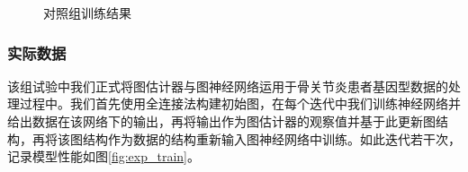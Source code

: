 \begin{figure}[ht]
\centering
{}
\caption{对照组训练结果}
\label{fig:baseline_train}
\end{figure}

\subsubsection{实际数据}

该组试验中我们正式将图估计器与图神经网络运用于骨关节炎患者基因型数据的处理过程中。我们首先使用全连接法构建初始图，在每个迭代中我们训练神经网络并给出数据在该网络下的输出，再将输出作为图估计器的观察值并基于此更新图结构，再将该图结构作为数据的结构重新输入图神经网络中训练。如此迭代若干次，记录模型性能如图\ref{fig:exp_train}。

